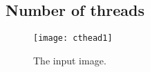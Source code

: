 \documentclass{InsightArticle}
\begin{document}
\subsection{Number of threads}







\begin{figure}[htbp]
\centering
\texttt{[image: cthead1]}
\caption{The input image.\label{cthead1}}
\end{figure}


\appendix





\nocite{ITKSoftwareGuide}
\end{document}
